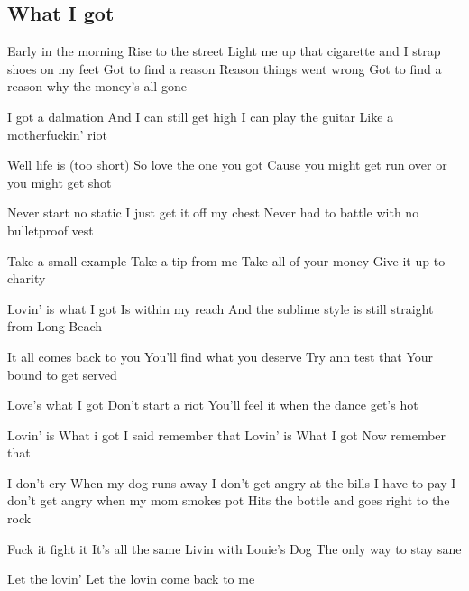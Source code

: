 \subsection*{What I got   }
\begin{guitar}
\begin{multicols}{2}
Early in the morning
Rise to the street
Light me up that cigarette 
and I strap shoes on my feet
Got to find a reason 
Reason things went wrong
Got to find a reason 
why the money's all gone

I got a dalmation 
And I can still get high
I can play the guitar 
Like a motherfuckin' riot

Well life is (too short) 
So love the one you got
Cause you might get run over
or you might get shot

Never start no static
I just get it off my chest
Never had to battle with no 
bulletproof vest 

Take a small example 
Take a tip from me
Take all of your money
Give it up to charity

Lovin' is what I got 
Is within my reach
And the sublime style
is still straight from Long Beach

It all comes back to you 
You'll find what you deserve
Try ann test that 
Your bound to get served

Love's what I got
Don't start a riot
You'll feel it when
the dance get's hot

Lovin' is
What i got
I said remember that
Lovin' is 
What I got
Now remember that
\columnbreak

I don't cry 
When my dog runs away
I don't get angry 
at the bills I have to pay
I don't get angry
when my mom smokes pot
Hits the bottle 
and goes right to the rock

Fuck it fight it
It's all the same
Livin with Louie's Dog
The only way to stay sane

Let the lovin' 
Let the lovin come back to me
\end{multicols}
\end{guitar}
